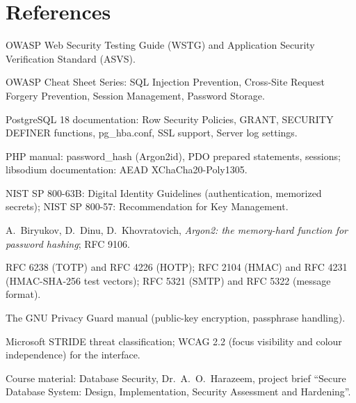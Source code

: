 \documentclass[10pt,a4paper]{article}
\begin{document}
\section{References}\label{sec:refs}
\begin{enumerate}[label={[\arabic*]}]
\item OWASP Web Security Testing Guide (WSTG) and Application Security Verification Standard (ASVS).
\item OWASP Cheat Sheet Series: SQL Injection Prevention, Cross-Site Request Forgery Prevention, Session Management, Password Storage.
\item PostgreSQL 18 documentation: Row Security Policies, GRANT, SECURITY DEFINER functions, pg\_hba.conf, SSL support, Server log settings.
\item PHP manual: password\_hash (Argon2id), PDO prepared statements, sessions; libsodium documentation: AEAD XChaCha20-Poly1305.
\item NIST SP 800-63B: Digital Identity Guidelines (authentication, memorized secrets); NIST SP 800-57: Recommendation for Key Management.
\item A.\ Biryukov, D.\ Dinu, D.\ Khovratovich, \emph{Argon2: the memory-hard function for password hashing}; RFC 9106.
\item RFC 6238 (TOTP) and RFC 4226 (HOTP); RFC 2104 (HMAC) and RFC 4231 (HMAC-SHA-256 test vectors); RFC 5321 (SMTP) and RFC 5322 (message format).
\item The GNU Privacy Guard manual (public-key encryption, passphrase handling).
\item Microsoft STRIDE threat classification; WCAG 2.2 (focus visibility and colour independence) for the interface.
\item Course material: Database Security, Dr.\ A.\ O.\ Harazeem, project brief ``Secure Database System: Design, Implementation, Security Assessment and Hardening''.
\end{enumerate}
\clearpage
\end{document}
